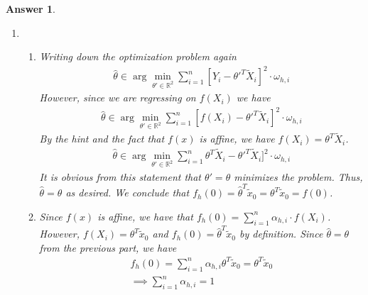 \documentclass[12pt]{article}
\theoremstyle{colon}
\newtheorem*{answer}{Answer}
\begin{document}
\begin{answer}
\begin{enumerate}[label=\arabic*)]
    \item
      \leavevmode
      \begin{enumerate}[label=\alph*)]
        \item Writing down the optimization problem again
          \begin{gather*}
            \widehat{\theta} \in \arg\min_{\theta' \in \mathbb{R}^2} \sum_{i=1}^n [Y_i - \theta'^T \tilde{X}_i]^2 \cdot \omega_{h,i}
          \end{gather*}
          However, since we are regressing on $f(X_i)$ we have
          \begin{gather*}
            \widehat{\theta} \in \arg\min_{\theta' \in \mathbb{R}^2} \sum_{i=1}^n [f(X_i) - \theta'^T \tilde{X}_i]^2 \cdot \omega_{h,i}
          \end{gather*}
          By the hint and the fact that $f(x)$ is affine, we have $f(X_i) = \theta^T \tilde{X}_i$.
          \begin{gather*}
            \widehat{\theta} \in \arg\min_{\theta' \in \mathbb{R}^2} \sum_{i=1}^n \theta^T \tilde{X}_i - \theta'^T \tilde{X}_i]^2 \cdot \omega_{h,i}
          \end{gather*}
          It is obvious from this statement that $\theta' = \theta$ minimizes the problem. Thus, $\widehat{\theta} = \theta$ as desired. We conclude that $f_h(0) = \widehat{\theta}^T \tilde{x}_0 = \theta^T \tilde{x}_0 = f(0)$.

        \item Since $f(x)$ is affine, we have that $f_h(0) = \sum_{i=1}^n \alpha_{h,i} \cdot f(X_i)$. However, $f(X_i) = \theta^T \tilde{x}_0$ and $f_h(0) = \widehat{\theta}^T \tilde{x}_0$ by definition. Since $\widehat{\theta} = \theta$ from the previous part, we have
          \begin{gather*}
            f_h(0) = \sum_{i=1}^n \alpha_{h,i} \theta^T \tilde{x}_0 = \theta^T \tilde{x}_0 \\
            \implies \sum_{i=1}^n \alpha_{h,i} = 1
          \end{gather*}
      \end{enumerate}


\end{enumerate}
\end{answer}
\end{document}
